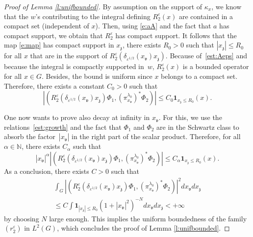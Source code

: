 \documentclass[JEP,XML,SOM,Unicode,published]{cedram}
\newcommand{\bun}{\mathbf{1}}
\theoremstyle{plain}
\theoremstyle{definition}
\let\eps\varepsilon
\def\N{{\mathbb N}}
\begin{document}
\begin{proof}[Proof of Lemma \ref{l:unifbounded}]
By assumption on the support of $\kappa_x$, we know that the $w$'s contributing to the integral defining $R_2^\eps(x)$ are contained in a compact set (independent of $x$). Then, using \eqref{e:aA} and the fact that $a$ has compact support, we obtain that $R_2^\eps$ has compact support. It follows that the map \eqref{e:map} has compact support in $x_{\mathfrak z}$, \ie there exists $R_0>0$ such that $|x_{\mathfrak z}|\leq R_0$ for all $x$ that are in the support of $R_2^\eps(\delta_{\eps^{1/2}} (x_{\mathfrak v})x_{\mathfrak z})$. Because of~\eqref{est:Aeps} and because the integral is compactly supported in~$w$, $R_2^\eps(x)$
is a bounded operator for all $x\in G$. Besides, the bound is uniform since $x$ belongs to a compact set.
Therefore, there exists a constant $C_0>0$ such that
\[
\left| \left(R_2^\eps(\delta_{\eps^{1/2}} (x_{\mathfrak v})x_{\mathfrak z}) \Phi_1,
(\pi^{\lambda_0}_{x_{\mathfrak v}})^*\Phi_2\right)\right|\leq C_0 \bun_{x_{\mathfrak z} \leq R_0} (x).
\]

One now wants to prove also decay at infinity in $x_{\mathfrak v}$. For this, we
use the relations~\eqref{est:growth} and the fact that $\Phi_1$ and $\Phi_2$ are in the Schwartz class to absorb the factor~$|x_{\mathfrak v}|$ in the right part of the scalar product. Therefore, for all $\alpha\in \N$, there exists $C_\alpha$ such that
\[
|x_{\mathfrak v}|^\alpha \left| \left(R_2^\eps(\delta_{\eps^{1/2}} (x_{\mathfrak v})x_{\mathfrak z}) \Phi_1,
(\pi^{\lambda_0}_{x_{\mathfrak v}})^*\Phi_2\right)\right|\leq C_\alpha \bun_{x_{\mathfrak z} \leq R_0} (x).
\]
As a conclusion, there exists $C>0$ such that
\begin{multline*}
\int_G\left|\left(R_2^\eps(\delta_{\eps^{1/2}} (x_{\mathfrak v})x_{\mathfrak z}) \Phi_1,
(\pi^{\lambda_0}_{x_{\mathfrak v}})^*\Phi_2\right)\right|^2 dx_{\mathfrak v} dx_{\mathfrak z}\\[-5pt]
\leq C \int \bun_{|x_{\mathfrak z} |\leq R_0} (1+|x_{\mathfrak v}|^2)^{-N} dx_{\mathfrak v} dx_{\mathfrak z}<+\infty
\end{multline*}
by choosing $N$ large enough. This implies the uniform boundedness of the family $(r_2^\eps)$ in $L^2(G)$, which concludes the proof of Lemma \ref{l:unifbounded}.
\end{proof}
\end{document}
